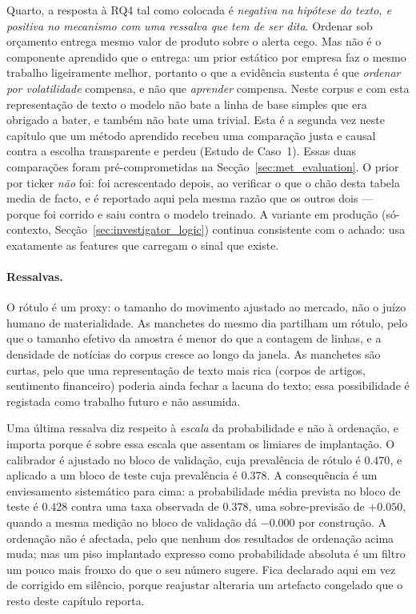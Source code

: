 Quarto, a resposta à \gls{RQ}4 tal como colocada é \emph{negativa na hipótese do texto, e positiva no
mecanismo com uma ressalva que tem de ser dita}. Ordenar sob orçamento entrega mesmo valor de produto
sobre o alerta cego. Mas não é o componente aprendido que o entrega: um prior estático por empresa
faz o mesmo trabalho ligeiramente melhor, portanto o que a evidência sustenta é que \emph{ordenar por
volatilidade} compensa, e não que \emph{aprender} compensa. Neste corpus e com esta representação de
texto o modelo não bate a linha de base simples que era obrigado a bater, e também não bate uma
trivial. Esta é a segunda vez neste capítulo que um método aprendido recebeu uma comparação justa e
causal contra a escolha transparente e perdeu (Estudo de Caso~1). Essas duas comparações foram
pré-comprometidas na Secção~\ref{sec:met_evaluation}. O prior por ticker \emph{não} foi: foi
acrescentado depois, ao verificar o que o chão desta tabela media de facto, e é reportado aqui pela
mesma razão que os outros dois --- porque foi corrido e saiu contra o modelo treinado. A variante em
produção (só-contexto, Secção~\ref{sec:investigator_logic}) continua consistente com o achado: usa
exatamente as features que carregam o sinal que existe.

\paragraph{Ressalvas.} O rótulo é um proxy: o tamanho do movimento ajustado ao mercado, não o juízo humano de
materialidade. As manchetes do mesmo dia partilham um rótulo, pelo que o tamanho efetivo da amostra é menor do
que a contagem de linhas, e a densidade de notícias do corpus cresce ao longo da janela. As manchetes são
curtas, pelo que uma representação de texto mais rica (corpos de artigos, sentimento financeiro) poderia ainda
fechar a lacuna do texto; essa possibilidade é registada como trabalho futuro e não assumida.

Uma última ressalva diz respeito à \emph{escala} da probabilidade e não à ordenação, e importa
porque é sobre essa escala que assentam os limiares de implantação. O calibrador é ajustado no bloco
de validação, cuja prevalência de rótulo é $0.470$, e aplicado a um bloco de teste cuja prevalência é
$0.378$. A consequência é um enviesamento sistemático para cima: a probabilidade média prevista no
bloco de teste é $0.428$ contra uma taxa observada de $0.378$, uma sobre-previsão de $+0.050$, quando
a mesma medição no bloco de validação dá $-0.000$ por construção. A ordenação não é afectada, pelo
que nenhum dos resultados de ordenação acima muda; mas um piso implantado expresso como probabilidade
absoluta é um filtro um pouco mais frouxo do que o seu número sugere. Fica declarado aqui em vez de
corrigido em silêncio, porque reajustar alteraria um artefacto congelado que o resto deste capítulo
reporta.

